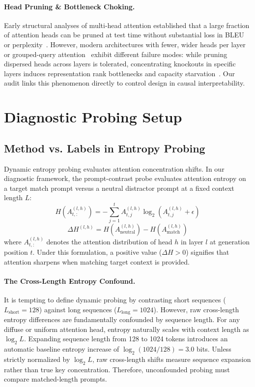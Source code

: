 \documentclass[11pt]{article}
\begin{document}
\paragraph{Head Pruning \& Bottleneck Choking.}
Early structural analyses of multi-head attention established that a large fraction of attention heads can be pruned at test time without substantial loss in BLEU or perplexity~\cite{voita2019analyzing,michel2019sixteen}. However, modern architectures with fewer, wider heads per layer or grouped-query attention~\cite{dubey2024llama3,qwen2024technical} exhibit different failure modes: while pruning dispersed heads across layers is tolerated, concentrating knockouts in specific layers induces representation rank bottlenecks and capacity starvation~\cite{bhojanapalli2020lowrank}. Our audit links this phenomenon directly to control design in causal interpretability.

\section{Diagnostic Probing Setup}
\label{sec:diagnostic}

\subsection{Method vs. Labels in Entropy Probing}
Dynamic entropy probing evaluates attention concentration shifts. In our diagnostic framework, the prompt-contrast probe evaluates attention entropy on a target match prompt versus a neutral distractor prompt at a fixed context length $L$:
\begin{equation}
H(A_{t, :}^{(l, h)}) = -\sum_{j=1}^{t} A_{t, j}^{(l, h)} \log_2 \left(A_{t, j}^{(l, h)} + \epsilon\right)
\end{equation}
\begin{equation}
\Delta H^{(l, h)} = H(A_{\text{neutral}}^{(l, h)}) - H(A_{\text{match}}^{(l, h)})
\end{equation}
where $A_{t, :}^{(l, h)}$ denotes the attention distribution of head $h$ in layer $l$ at generation position $t$. Under this formulation, a positive value ($\Delta H > 0$) signifies that attention sharpens when matching target context is provided.

\paragraph{The Cross-Length Entropy Confound.}
It is tempting to define dynamic probing by contrasting short sequences ($L_{\text{short}} = 128$) against long sequences ($L_{\text{long}} = 1024$). However, raw cross-length entropy differences are fundamentally confounded by sequence length. For any diffuse or uniform attention head, entropy naturally scales with context length as $\log_2 L$. Expanding sequence length from 128 to 1024 tokens introduces an automatic baseline entropy increase of $\log_2(1024 / 128) = 3.0$ bits. Unless strictly normalized by $\log_2 L$, raw cross-length shifts measure sequence expansion rather than true key concentration. Therefore, unconfounded probing must compare matched-length prompts.
\end{document}
